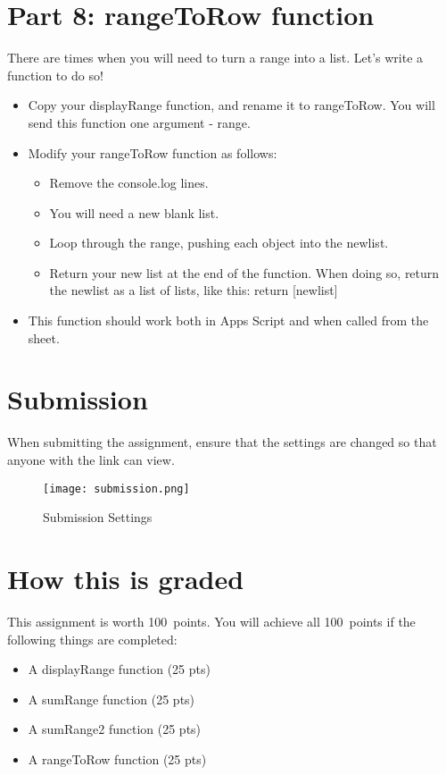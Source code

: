 \documentclass{article}
\newcommand{\AValue}{100}
\begin{document}
\section*{Part 8: rangeToRow function}
There are times when you will need to turn a range into a list.  Let's write a function to do so!
\begin{itemize}
	\item  Copy your displayRange function, and rename it to rangeToRow.  You will send this function one argument - range.
	\item Modify your rangeToRow function as follows:
	\begin{itemize}
		\item Remove the console.log lines.
		\item You will need a new blank list.
		\item Loop through the range, pushing each object into the newlist.
		\item Return your new list at the end of the function.  When doing so, return the newlist as a list of lists, like this:  return [newlist]
	\end{itemize}
	\item This function should work both in Apps Script and when called from the sheet.
\end{itemize}

\section*{Submission}
When submitting the assignment, ensure that the settings are changed so that anyone with the link can view.
\begin{figure}[H]
  \centering
  \texttt{[image: submission.png]}
  \caption{Submission Settings}
\end{figure}

\section*{How this is graded}
This assignment is worth \AValue \ points. You will achieve all \AValue \   points if the following things are completed:
\begin{itemize}
    \item A displayRange function (25 pts)
    \item A sumRange function (25 pts)
    \item A sumRange2 function (25 pts)
    \item A rangeToRow function (25 pts)
\end{itemize}
\end{document}
